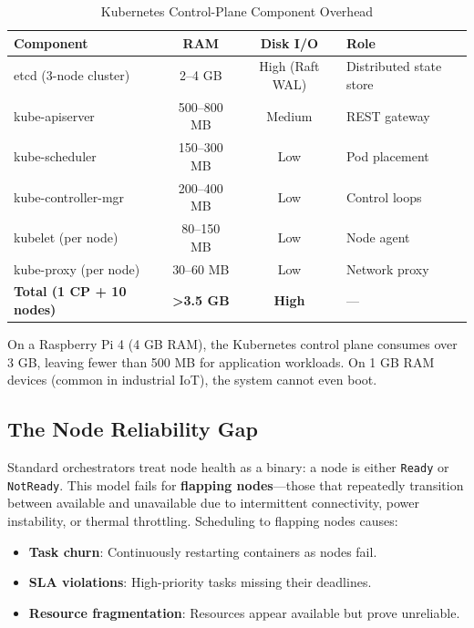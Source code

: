 \documentclass[11pt,a4paper]{article}
\begin{document}
\begin{table}[H]
\centering
\caption{Kubernetes Control-Plane Component Overhead}
\label{tab:k8s_overhead}
\begin{tabular}{@{} l c c l @{}}
\toprule
\textbf{Component}    & \textbf{RAM}    & \textbf{Disk I/O} & \textbf{Role} \\
\midrule
etcd (3-node cluster) & 2--4 GB         & High (Raft WAL)   & Distributed state store \\
kube-apiserver        & 500--800 MB     & Medium            & REST gateway \\
kube-scheduler        & 150--300 MB     & Low               & Pod placement \\
kube-controller-mgr   & 200--400 MB     & Low               & Control loops \\
kubelet (per node)    & 80--150 MB      & Low               & Node agent \\
kube-proxy (per node) & 30--60 MB       & Low               & Network proxy \\
\midrule
\textbf{Total (1 CP + 10 nodes)} & \textbf{>3.5 GB} & \textbf{High} & --- \\
\bottomrule
\end{tabular}
\end{table}

On a Raspberry Pi 4 (4 GB RAM), the Kubernetes control plane consumes over 3 GB, leaving
fewer than 500 MB for application workloads. On 1 GB RAM devices (common in industrial IoT),
the system cannot even boot.

\subsection{The Node Reliability Gap}

Standard orchestrators treat node health as a binary: a node is either \texttt{Ready} or
\texttt{NotReady}. This model fails for \textbf{flapping nodes}---those that repeatedly
transition between available and unavailable due to intermittent connectivity, power
instability, or thermal throttling. Scheduling to flapping nodes causes:

\begin{itemize}
  \item \textbf{Task churn}: Continuously restarting containers as nodes fail.
  \item \textbf{SLA violations}: High-priority tasks missing their deadlines.
  \item \textbf{Resource fragmentation}: Resources appear available but prove unreliable.
\end{itemize}
\end{document}
